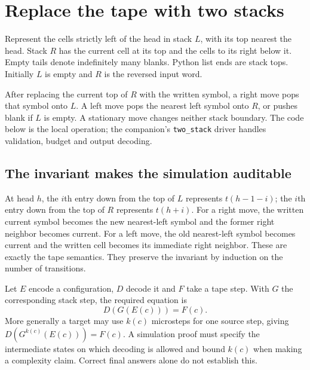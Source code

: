 \section{Replace the tape with two stacks}
Represent the cells strictly left of the head in stack $L$, with its top
nearest the head. Stack $R$ has the current cell at its top and the cells
to its right below it. Empty tails denote indefinitely many blanks. Python
list ends are stack tops. Initially $L$ is empty and $R$ is the reversed
input word.

After replacing the current top of $R$ with the written symbol, a right move
pops that symbol onto $L$. A left move pops the nearest left symbol onto
$R$, or pushes blank if $L$ is empty. A stationary move changes neither
stack boundary. The code below is the local operation; the companion's
\texttt{two\_stack} driver handles validation, budget and output decoding.


\subsection{The invariant makes the simulation auditable}
At head $h$, the $i$th entry down from the top of $L$ represents
$t(h-1-i)$; the $i$th entry down from the top of $R$ represents $t(h+i)$.
For a right move, the written current symbol becomes the new nearest-left
symbol and the former right neighbor becomes current. For a left move,
the old nearest-left symbol becomes current and the written cell becomes
its immediate right neighbor. These are exactly the tape semantics.
They preserve the invariant by induction on the number of transitions.

Let $E$ encode a configuration, $D$ decode it and $F$ take a tape step.
With $G$ the corresponding stack step, the required equation is
\begin{equation}
 D(G(E(c)))=F(c).
\end{equation}
More generally a target may use $k(c)$ microsteps for one source step,
giving $D(G^{k(c)}(E(c)))=F(c)$. A simulation proof must specify the
intermediate states on which decoding is allowed and bound $k(c)$ when
making a complexity claim. Correct final answers alone do not establish this.

